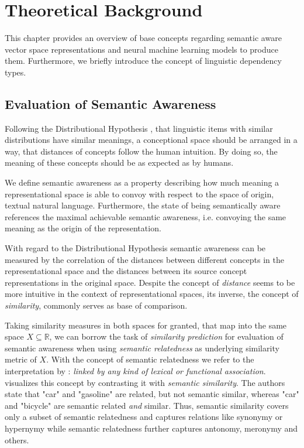 \section{Theoretical Background}

This chapter provides an overview of base concepts regarding semantic aware vector space representations and neural machine learning models to produce them. Furthermore, we briefly introduce the concept of linguistic dependency types.

\subsection{Evaluation of Semantic Awareness} \label{subsec:eval_semantic_awareness}
Following the Distributional Hypothesis \autocite{sahlgren_distributional_2008,harris_distributional_1954}, that linguistic items with similar distributions have similar meanings, a conceptional space should be arranged in a way, that distances of concepts follow the human intuition. By doing so, the meaning of these concepts should be as expected as by humans.

We define semantic awareness as a property describing how much meaning a representational space is able to convoy with respect to the space of origin, textual natural language. Furthermore, the state of being semantically aware references the maximal achievable semantic awareness, i.e. convoying the same meaning as the origin of the representation. %

With regard to the Distributional Hypothesis semantic awareness can be measured by the correlation of the distances between different concepts in the representational space and the distances between its source concept representations in the original space. Despite the concept of \textit{distance} seems to be more intuitive in the context of representational spaces, its inverse, the concept of \textit{similarity}, commonly serves as base of comparison.  

Taking similarity measures in both spaces for granted, that map into the same space $X \subseteq \mathbb{R}$, we can borrow the task of \textit{similarity prediction}  for evaluation of semantic awareness when using \textit{semantic relatedness} as underlying similarity metric of $X$. With the concept of semantic relatedness we refer to the interpretation by \textcite{budanitsky_evaluating_2006}: \textit{linked by any kind of lexical or functional association}. \textcite{resnik_semantic_1999} visualizes this concept by contrasting it with \textit{semantic similarity}. The authors state that "car" and "gasoline" are related, but not semantic similar, whereas "car" and "bicycle" are semantic related \textit{and} similar. Thus, semantic similarity covers only a subset of semantic relatedness and captures relations like synonymy or hypernymy while semantic relatedness further captures antonomy, meronymy and others.

